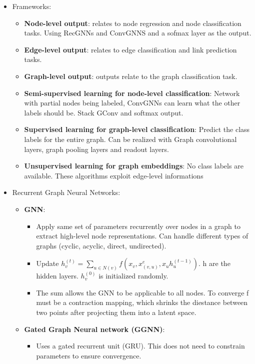 \begin{itemize}[noitemsep,nolistsep]
	\item Frameworks:
	\begin{itemize}[noitemsep,nolistsep]
		\item \textbf{Node-level output}: relates to node regression and node classification tasks. Using RecGNNs and ConvGNNS and a sofmax layer as the output.
		\item \textbf{Edge-level output}: relates to edge classification and link prediction tasks. 
		\item \textbf{Graph-level output}: outputs relate to the graph classification task.
		\item \textbf{Semi-supervised learning for node-level classification}: Network with partial nodes being labeled, ConvGNNs can learn what the other labels should be. Stack GConv and softmax output.
		\item \textbf{Supervised learning for graph-level classification}: Predict the class labels for the entire graph. Can be realized with Graph convolutional layers, graph pooling layers and readout layers.
		\item \textbf{Unsupervised learning for graph embeddings}: No class labels are available. These algorithms exploit edge-level informations
	\end{itemize}
	\item Recurrent Graph Neural Networks:
	\begin{itemize}[noitemsep,nolistsep]
		\item \textbf{GNN}:
		\begin{itemize}[noitemsep,nolistsep]
			\item Apply same set of parameters recurrently over nodes in a graph to extract high-level node representations. Can handle different types of graphs (cyclic, acyclic, direct, undirected).
			\item Update $h_v^{(t)} = \sum_{u \in N(v)} f(x_v, x^e_{(v,u)}, x_u h_u^{(t-1)})$. h are the hidden layers. $h_v^{(0)}$ is initialized randomly.
			\item The sum allows the GNN to be applicable to all nodes. To converge f must be a contraction mapping, which shrinks the diestance between two points after projecting them into a latent space.
		\end{itemize}
		\item \textbf{Gated Graph Neural network (GGNN)}:
		\begin{itemize}[noitemsep,nolistsep]
			\item Uses a gated recurrent unit (GRU). This does not need to constrain parameters to ensure convergence.

\end{itemize}
\end{itemize}
\end{itemize}
